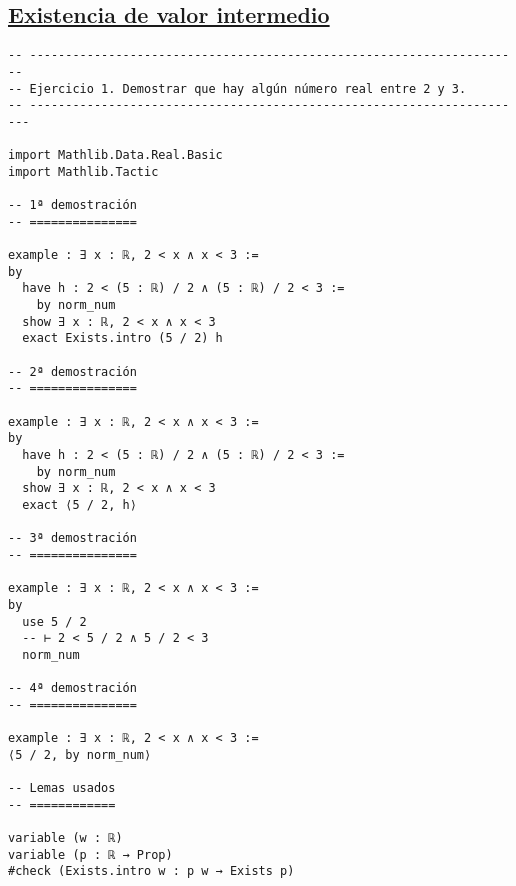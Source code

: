 \subsection{\href{./src/Logica/Existencia\_de\_valor\_intermedio.lean}{Existencia de valor intermedio}}
\label{sec:org73f53cc}
\begin{verbatim}
-- ---------------------------------------------------------------------
-- Ejercicio 1. Demostrar que hay algún número real entre 2 y 3.
-- ----------------------------------------------------------------------

import Mathlib.Data.Real.Basic
import Mathlib.Tactic

-- 1ª demostración
-- ===============

example : ∃ x : ℝ, 2 < x ∧ x < 3 :=
by
  have h : 2 < (5 : ℝ) / 2 ∧ (5 : ℝ) / 2 < 3 :=
    by norm_num
  show ∃ x : ℝ, 2 < x ∧ x < 3
  exact Exists.intro (5 / 2) h

-- 2ª demostración
-- ===============

example : ∃ x : ℝ, 2 < x ∧ x < 3 :=
by
  have h : 2 < (5 : ℝ) / 2 ∧ (5 : ℝ) / 2 < 3 :=
    by norm_num
  show ∃ x : ℝ, 2 < x ∧ x < 3
  exact ⟨5 / 2, h⟩

-- 3ª demostración
-- ===============

example : ∃ x : ℝ, 2 < x ∧ x < 3 :=
by
  use 5 / 2
  -- ⊢ 2 < 5 / 2 ∧ 5 / 2 < 3
  norm_num

-- 4ª demostración
-- ===============

example : ∃ x : ℝ, 2 < x ∧ x < 3 :=
⟨5 / 2, by norm_num⟩

-- Lemas usados
-- ============

variable (w : ℝ)
variable (p : ℝ → Prop)
#check (Exists.intro w : p w → Exists p)
\end{verbatim}

